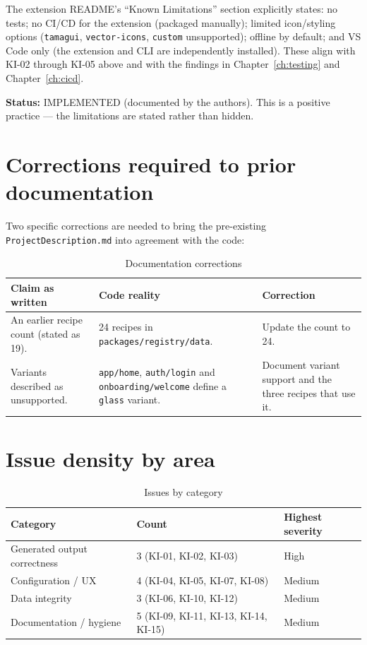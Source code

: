 The extension README's ``Known Limitations'' section explicitly states: no tests;
no CI/CD for the extension (packaged manually); limited icon/styling options
(\texttt{tamagui}, \texttt{vector-icons}, \texttt{custom} unsupported); offline
by default; and VS Code only (the extension and CLI are independently installed).
These align with KI-02 through KI-05 above and with the findings in
Chapter~\ref{ch:testing} and Chapter~\ref{ch:cicd}.

\textbf{Status:} IMPLEMENTED (documented by the authors). This is a positive
practice --- the limitations are stated rather than hidden.

\section{Corrections required to prior documentation}

Two specific corrections are needed to bring the pre-existing
\texttt{ProjectDescription.md} into agreement with the code:

\begin{longtable}{p{5.2cm}p{4.2cm}p{4.6cm}}
\caption{Documentation corrections}\\
\toprule
\textbf{Claim as written} & \textbf{Code reality} & \textbf{Correction} \\
\midrule

An earlier recipe count (stated as 19). & 24 recipes in
\texttt{packages/registry/data}. & Update the count to 24. \\
Variants described as unsupported. & \texttt{app/home}, \texttt{auth/login} and
\texttt{onboarding/welcome} define a \texttt{glass} variant. & Document variant
support and the three recipes that use it. \\
\bottomrule
\end{longtable}

\section{Issue density by area}

\begin{table}[H]
\centering
\caption{Issues by category}
\begin{tabular}{p{5cm}p{4cm}p{5cm}}
\toprule
\textbf{Category} & \textbf{Count} & \textbf{Highest severity} \\
\midrule
Generated output correctness & 3 (KI-01, KI-02, KI-03) & High \\
Configuration / UX & 4 (KI-04, KI-05, KI-07, KI-08) & Medium \\
Data integrity & 3 (KI-06, KI-10, KI-12) & Medium \\
Documentation / hygiene & 5 (KI-09, KI-11, KI-13, KI-14, KI-15) & Medium \\
\bottomrule
\end{tabular}
\end{table}

